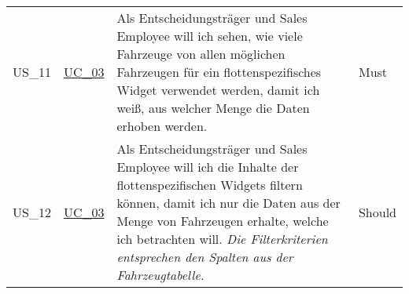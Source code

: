 \begin{footnotesize}
\begin{longtable}[L L L L]{ p{} p{} p{} p{}}
      \hypertarget{Ref:US11}{US\_11} & \hyperlink{Ref:UC3}{UC\_03} & Als Entscheidungsträger und Sales Employee will ich sehen, wie viele Fahrzeuge von allen möglichen Fahrzeugen für ein flottenspezifisches Widget verwendet werden, damit ich weiß, aus welcher Menge die Daten erhoben werden. & Must \\

      \hypertarget{Ref:US12}{US\_12} & \hyperlink{Ref:UC3}{UC\_03} & Als Entscheidungsträger und Sales Employee will ich die Inhalte der flottenspezifischen Widgets filtern können, damit ich nur die Daten aus der Menge von Fahrzeugen erhalte, welche ich betrachten will.
      \newline\newline
      \emph{Die Filterkriterien entsprechen den Spalten aus der Fahrzeugtabelle.}
      & Should \\

      \bottomrule
    \end{longtable}
  \end{footnotesize}
  \rmfamily

